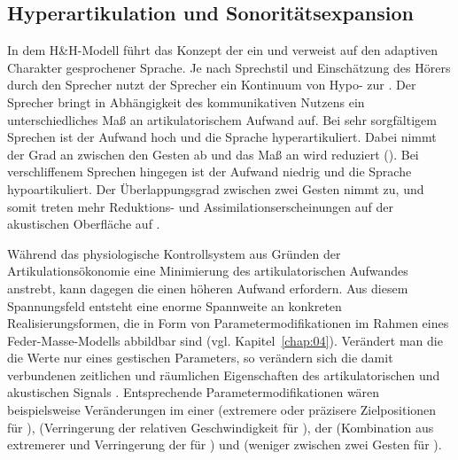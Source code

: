 \subsection{Hyperartikulation und Sonoritätsexpansion}
\label{subsec:050101}

In dem H\&H-Modell führt \citet{Lindblom1990} das Konzept der  ein und verweist auf den adaptiven Charakter gesprochener Sprache. Je nach Sprechstil und Einschätzung des Hörers durch den Sprecher nutzt der Sprecher ein Kontinuum von Hypo- zur  \citep{Liberman1985, Farnetani2010}. Der Sprecher bringt in Abhängigkeit des kommunikativen Nutzens ein unterschiedliches Maß an artikulatorischem Aufwand auf. Bei sehr sorgfältigem Sprechen ist der Aufwand hoch und die Sprache hyperartikuliert. Dabei nimmt der Grad an  zwischen den Gesten ab und das Maß an  wird reduziert (). Bei verschliffenem Sprechen hingegen ist der Aufwand niedrig und die Sprache hypoartikuliert. Der Überlappungsgrad zwischen zwei Gesten nimmt zu, und somit treten mehr Reduktions- und Assimilationserscheinungen auf der akustischen Oberfläche auf \citep[Hypoartikulation; vgl. auch][]{DeJong1993,Kröger1998}.

Während das physiologische Kontrollsystem aus Gründen der Artikulationsökonomie eine Minimierung des artikulatorischen Aufwandes anstrebt, kann dagegen die  einen höheren Aufwand erfordern. Aus diesem Spannungsfeld entsteht eine enorme Spannweite an konkreten Realisierungsformen, die in Form von Parametermodifikationen im Rahmen eines Feder-Masse-Modells abbildbar sind (vgl. Kapitel~\ref{chap:04}). Verändert man die die Werte nur eines gestischen Parameters, so verändern sich die damit verbundenen zeitlichen und räumlichen Eigenschaften des artikulatorischen und akustischen Signals \citep[vgl.][]{Saltzman1986, Saltzman1987, Saltzman1989, Browman1989, Browman1992a}. Entsprechende Parametermodifikationen wären beispielsweise Veränderungen im  einer  (extremere oder präzisere Zielpositionen für ),  (Verringerung der relativen Geschwindigkeit für ),  der  (Kombination aus extremerer  und Verringerung der  für ) und  (weniger  zwischen zwei Gesten für ). 

